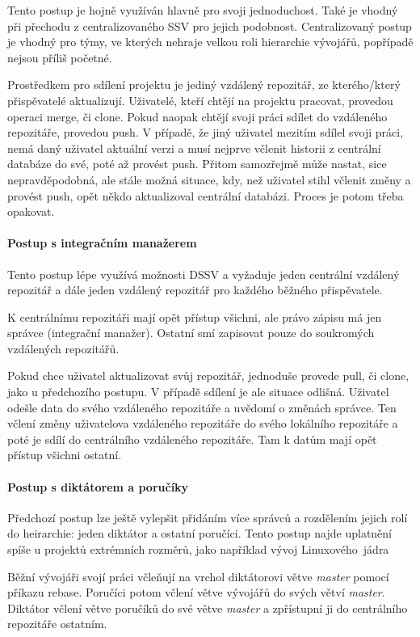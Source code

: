 \documentclass[
  biblatex,
  glossaries,
  index
]{kidiplom}
\begin{document}
Tento postup je hojně využíván hlavně pro svoji jednoduchost. Také je vhodný při přechodu z centralizovaného SSV pro jejich podobnost. Centralizovaný postup je vhodný pro týmy, ve kterých nehraje velkou roli hierarchie vývojářů, popřípadě nejsou příliš početné.

Prostředkem pro sdílení projektu je jediný vzdálený repozitář, ze kterého/který přispěvatelé aktualizují. Uživatelé, kteří chtějí na projektu pracovat, provedou operaci merge, či clone. Pokud naopak chtějí svoji práci sdílet do vzdáleného repozitáře, provedou push. V případě, že jiný uživatel mezitím sdílel svoji práci, nemá daný uživatel aktuální verzi a musí nejprve včlenit historii z centrální databáze do své, poté až provést push. Přitom samozřejmě může nastat, sice nepravděpodobná, ale stále možná situace, kdy, než uživatel stihl včlenit změny a provést push, opět někdo aktualizoval centrální databázi. Proces je potom třeba opakovat.

\paragraph*{Postup s integračním manažerem}
Tento postup lépe využívá možnosti DSSV a vyžaduje jeden centrální vzdálený repozitář a dále jeden vzdálený repozitář pro každého běžného přispěvatele.

K centrálnímu repozitáři mají opět přístup všichni, ale právo zápisu má jen správce (integrační manažer). Ostatní smí zapisovat pouze do soukromých vzdálených repozitářů.

Pokud chce uživatel aktualizovat svůj repozitář, jednoduše provede pull, či clone, jako u předchozího postupu. V případě sdílení je ale situace odlišná. Uživatel odešle data do svého vzdáleného repozitáře a uvědomí o změnách správce. Ten včlení změny uživatelova vzdáleného repozitáře do svého lokálního repozitáře a poté je sdílí do centrálního vzdáleného repozitáře. Tam k datům mají opět přístup všichni ostatní.

\paragraph*{Postup s diktátorem a poručíky}
Předchozí postup lze ještě vylepšit přidáním více správců a rozdělením jejich rolí do heirarchie: jeden diktátor a ostatní poručíci. Tento postup najde uplatnění spíše u projektů extrémních rozměrů, jako například vývoj Linuxového~jádra~\cite{linux}

Běžní vývojáři svojí práci včleňují na vrchol diktátorovi větve {\it master} pomocí příkazu rebase. Poručíci potom včlení větve vývojářů do svých větví {\it master}. Diktátor včlení větve poručíků do své větve {\it master} a zpřístupní ji do centrálního repozitáře ostatním.
\end{document}
